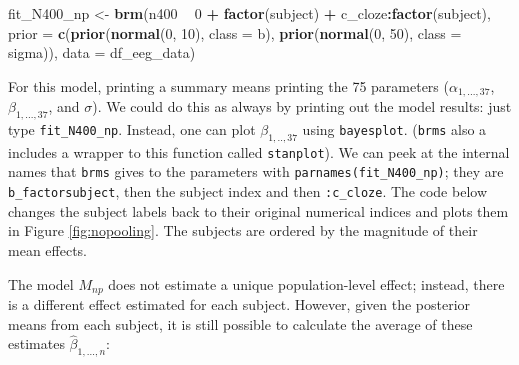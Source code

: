 \documentclass[12pt,]{krantz}
\newenvironment{Shaded}{\begin{snugshade}}{\end{snugshade}}
\newcommand{\DataTypeTok}[1]{\textcolor[rgb]{0.13,0.29,0.53}{#1}}
\newcommand{\DecValTok}[1]{\textcolor[rgb]{0.00,0.00,0.81}{#1}}
\newcommand{\KeywordTok}[1]{\textcolor[rgb]{0.13,0.29,0.53}{\textbf{#1}}}
\newcommand{\NormalTok}[1]{#1}
\newcommand{\OperatorTok}[1]{\textcolor[rgb]{0.81,0.36,0.00}{\textbf{#1}}}
\newcommand{\StringTok}[1]{\textcolor[rgb]{0.31,0.60,0.02}{#1}}
\theoremstyle{definition}
\theoremstyle{definition}
\theoremstyle{definition}
\theoremstyle{remark}
\begin{document}
\begin{Shaded}
\begin{Highlighting}[]
\NormalTok{fit_N400_np <-}\StringTok{ }\KeywordTok{brm}\NormalTok{(n400 }\OperatorTok{~}\StringTok{ }\DecValTok{0} \OperatorTok{+}\StringTok{ }\KeywordTok{factor}\NormalTok{(subject) }\OperatorTok{+}\StringTok{ }\NormalTok{c_cloze}\OperatorTok{:}\KeywordTok{factor}\NormalTok{(subject),}
                 \DataTypeTok{prior =}
                     \KeywordTok{c}\NormalTok{(}\KeywordTok{prior}\NormalTok{(}\KeywordTok{normal}\NormalTok{(}\DecValTok{0}\NormalTok{, }\DecValTok{10}\NormalTok{), }\DataTypeTok{class =}\NormalTok{ b),}
                       \KeywordTok{prior}\NormalTok{(}\KeywordTok{normal}\NormalTok{(}\DecValTok{0}\NormalTok{, }\DecValTok{50}\NormalTok{), }\DataTypeTok{class =}\NormalTok{ sigma)),}
                 \DataTypeTok{data =}\NormalTok{ df_eeg_data)}
\end{Highlighting}
\end{Shaded}

For this model, printing a summary means printing the 75 parameters (\(\alpha_{1,...,37}\), \(\beta_{1,...,37}\), and \(\sigma\)). We could do this as always by printing out the model results: just type \texttt{fit\_N400\_np}. Instead, one can plot \(\beta_{1,..,37}\) using \texttt{bayesplot}. (\texttt{brms} also a includes a wrapper to this function called \texttt{stanplot}). We can peek at the internal names that \texttt{brms} gives to the parameters with \texttt{parnames(fit\_N400\_np)}; they are \texttt{b\_factorsubject}, then the subject index and then \texttt{:c\_cloze}. The code below changes the subject labels back to their original numerical indices and plots them in Figure \ref{fig:nopooling}. The subjects are ordered by the magnitude of their mean effects.

The model \(M_{np}\) does not estimate a unique population-level effect; instead, there is a different effect estimated for each subject. However, given the posterior means from each subject, it is still possible to calculate the average of these estimates \(\hat\beta_{1,...,n}\):
\end{document}
